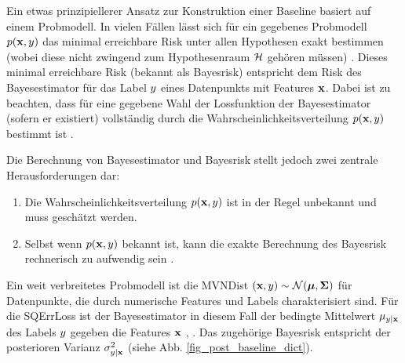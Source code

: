 {{{{{{		Ein etwas prinzipiellerer Ansatz zur Konstruktion einer Baseline basiert auf einem \gls{Probmodell}. In vielen Fällen lässt sich für ein gegebenes \gls{Probmodell} $p({\bf x},y)$ das minimal erreichbare \gls{Risk} unter allen Hypothesen exakt bestimmen (wobei diese nicht zwingend zum \gls{Hypothesenraum} $\mathcal{H}$ gehören müssen) \cite{LC}. Dieses minimal erreichbare \gls{Risk} (bekannt als \gls{Bayesrisk}) entspricht dem \gls{Risk} des \gls{Bayesestimator} für das \gls{Label} $y$ eines \gls{Datenpunkts} mit \gls{Features} ${\bf x}$. Dabei ist zu beachten, dass für eine gegebene Wahl der \gls{Lossfunktion} der \gls{Bayesestimator} (sofern er existiert) vollständig durch die \gls{Wahrscheinlichkeitsverteilung} $p({\bf x},y)$ bestimmt ist \cite[Kap. 4]{LC}. 
		
		Die Berechnung von \gls{Bayesestimator} und \gls{Bayesrisk} stellt jedoch zwei zentrale Herausforderungen dar:
		\begin{enumerate}[label=\arabic*)]
			\item Die \gls{Wahrscheinlichkeitsverteilung} $p({\bf x},y)$ ist in der Regel unbekannt und muss geschätzt werden.
			\item Selbst wenn $p({\bf x},y)$ bekannt ist, kann die exakte Berechnung des \gls{Bayesrisk} rechnerisch zu aufwendig sein \cite{cooper1990computational}.
		\end{enumerate}
		
		Ein weit verbreitetes \gls{Probmodell} ist die \gls{MVNDist} $\left( {\bf x},y \right) \sim \mathcal{N}({\bm \mu},{\bm \Sigma})$ für \gls{Datenpunkte}, die durch numerische \gls{Features} und \gls{Labels} charakterisiert sind. Für die \gls{SQErrLoss} ist der \gls{Bayesestimator} in diesem Fall der bedingte Mittelwert $\mu_{y|{\bf x}}$ des \gls{Labels} $y$ gegeben die \gls{Features} ${\bf x}$ \cite{LC}, \cite{GrayProbBook}. Das zugehörige \gls{Bayesrisk} entspricht der posterioren Varianz $\sigma^{2}_{y|{\bf x}}$ (siehe Abb. \ref{fig_post_baseline_dict}).
		
}}}}}}
